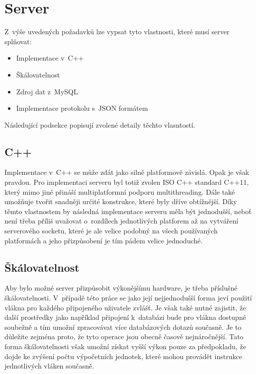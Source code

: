 \documentclass[thesis=B,czech]{FITthesis}[2013/10/20]
\begin{document}
\section{Server}

Z~výše uvedených požadavků lze vypsat tyto vlastnosti, které musí server splňovat:

\begin{itemize}
  \item{Implementace v~C++}
  \item{Škálovatelnost}
  \item{Zdroj dat z~MySQL}
  \item{Implementace protokolu s~JSON formátem}
\end{itemize}

Následující podsekce popisují zvolené detaily těchto vlasntostí.

\subsection{C++}

Implementace v~C++ se může zdát jako silně platformově závislá. Opak je však pravdou. Pro implementaci serveru byl totiž zvolen ISO C++ standard C++11, který mimo jiné přináší multiplatformní podporu multithreading. Dále také umožňuje tvořit snadněji určité konstrukce, které byly dříve obtížnější. Díky těmto vlastnostem by následná implementace serveru měla být jednodušší, neboť není třeba příliš uvažovat o~rozdílech jednotlivých platforem až na vytváření serverového socketu, které je ale velice podobný na všech používaných platformách a jeho přizpůsobení je tím pádem velice jednoduché.

\subsection{Škálovatelnost}

Aby bylo možné server přizpůsobit výkonějšímu hardware, je třeba příslušné škálovatelnosti. V~případě této práce se jako její nejjednodušší forma jeví použití vlákna pro každého připojeného uživatele zvlášť. Je však také nutné zajistit, že další prostředky jako například připojení k~databázi bude pro vlákna dostupné soubežně a tím umožní zpracovávat více databázových dotazů současně. Je to důležite zejména proto, že tyto operace jsou obecně časově nejnáročnější. Tato forma škálovatelnosti však umožní získat vyšší výkon pouze za předpokladu, že dojde ke zvýšení počtu výpočetních jednotek, které mohou provádět instrukce jednotlivých vláken současně.
\end{document}
